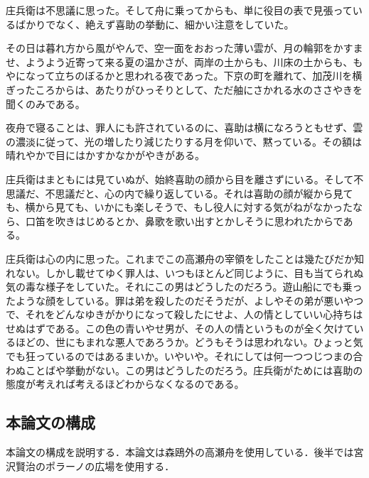 庄兵衛は不思議に思った。そして舟に乗ってからも、単に役目の表で見張っているばかりでなく、絶えず喜助の挙動に、細かい注意をしていた。

その日は暮れ方から風がやんで、空一面をおおった薄い雲が、月の輪郭をかすませ、ようよう近寄って来る夏の温かさが、両岸の土からも、川床の土からも、もやになって立ちのぼるかと思われる夜であった。下京の町を離れて、加茂川を横ぎったころからは、あたりがひっそりとして、ただ舳にさかれる水のささやきを聞くのみである。

夜舟で寝ることは、罪人にも許されているのに、喜助は横になろうともせず、雲の濃淡に従って、光の増したり減じたりする月を仰いで、黙っている。その額は晴れやかで目にはかすかなかがやきがある。

庄兵衛はまともには見ていぬが、始終喜助の顔から目を離さずにいる。そして不思議だ、不思議だと、心の内で繰り返している。それは喜助の顔が縦から見ても、横から見ても、いかにも楽しそうで、もし役人に対する気がねがなかったなら、口笛を吹きはじめるとか、鼻歌を歌い出すとかしそうに思われたからである。

庄兵衛は心の内に思った。これまでこの高瀬舟の宰領をしたことは幾たびだか知れない。しかし載せてゆく罪人は、いつもほとんど同じように、目も当てられぬ気の毒な様子をしていた。それにこの男はどうしたのだろう。遊山船にでも乗ったような顔をしている。罪は弟を殺したのだそうだが、よしやその弟が悪いやつで、それをどんなゆきがかりになって殺したにせよ、人の情としていい心持ちはせぬはずである。この色の青いやせ男が、その人の情というものが全く欠けているほどの、世にもまれな悪人であろうか。どうもそうは思われない。ひょっと気でも狂っているのではあるまいか。いやいや。それにしては何一つつじつまの合わぬことばや挙動がない。この男はどうしたのだろう。庄兵衛がためには喜助の態度が考えれば考えるほどわからなくなるのである。

\subsection{本論文の構成}
本論文の構成を説明する．本論文は森鴎外の高瀬舟を使用している．後半では宮沢賢治のポラーノの広場を使用する．